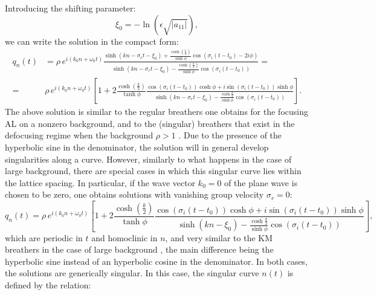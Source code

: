 \documentclass{article}
\begin{document}
Introducing the shifting parameter: 
\begin{equation}
\label{e:center}
{\xi_0}=-\ln (\epsilon\sqrt{|a_{11}|}),
\end{equation}
we can write the solution in the compact form:
\begin{equation}\label{dark_singulare}
\begin{split}
    q_n(t)
    & =\rho\, e^{i(k_0 n+\omega_0 t)}\frac{\sinh\left(k n -\sigma_r t-\xi_0\right)+\frac{\cosh\left(\frac{k}{2}\right)}{\sinh\phi}\cos\left(\sigma_i (t-t_0)-2i\phi\right)}{\sinh\left(k n -\sigma_r t-\xi_0\right)-\frac{\cosh\left(\frac{k}{2}\right)}{\sinh\phi}\cos(\sigma_i (t-t_0))}=\\[3mm]
    =&\rho\, e^{i(k_0 n+\omega_0 t)}\left[1+2\frac{\cosh\left(\frac{k}{2}\right)}{\tanh\phi}\frac{\cos(\sigma_i (t-t_0))\cosh\phi+i\sin(\sigma_i (t-t_0))\sinh\phi}{\sinh\left(k n -\sigma_r t-\xi_0\right)-\frac{\cosh\frac{k}{2}}{\sinh\phi}\cos\left(\sigma_i(t-t_0)\right)}\right].
    \end{split}
\end{equation}
The above solution is similar to the regular breathers one obtains for the focusing AL on a nonzero background, and to the (singular) breathers that exist in the defocusing regime when the background $\rho>1$ \cite{OP19,WM25}.
Due to the presence of the hyperbolic sine in the denominator, the solution will in general develop singularities along a curve. However, similarly to what happens in the case of large background, there are special cases in which this singular curve lies within the lattice spacing. In particular, if the wave vector $k_0=0$ of the plane wave is chosen to be zero, one obtains solutions with vanishing group velocity $\sigma_r=0$:
\begin{equation}\label{KM}
    q_n(t)
    =\rho\, e^{i(k_0 n+\omega_0 t)}\left[1+2\frac{\cosh\left(\frac{k}{2}\right)}{\tanh\phi}\frac{\cos(\sigma_i (t-t_0))\cosh\phi+i\sin(\sigma_i (t-t_0))\sinh\phi}{\sinh\left(k n-\xi_0\right)-\frac{\cosh\frac{k}{2}}{\sinh\phi}\cos\left(\sigma_i(t-t_0)\right)}\right],
\end{equation}
which are periodic in $t$ and homoclinic in $n$, and very similar to the KM breathers in the case of large background \cite{WM25}, the main difference being the hyperbolic sine instead of an hyperbolic cosine in the denominator. In both cases, the solutions are generically singular. In this case, the singular curve $n(t)$ is defined by the relation:
\end{document}
